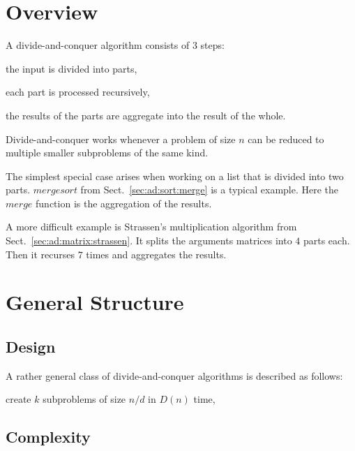 \section{Overview}

A divide-and-conquer algorithm consists of $3$ steps:
\begin{compactenum}
 \item the input is divided into parts,
 \item each part is processed recursively,
 \item the results of the parts are aggregate into the result of the whole.
\end{compactenum}
Divide-and-conquer works whenever a problem of size $n$ can be reduced to multiple smaller subproblems of the same kind.

The simplest special case arises when working on a list that is divided into two parts.
$mergesort$ from Sect.~\ref{sec:ad:sort:merge} is a typical example.
Here the $merge$ function is the aggregation of the results. 

A more difficult example is Strassen's multiplication algorithm from Sect.~\ref{sec:ad:matrix:strassen}.
It splits the arguments matrices into $4$ parts each.
Then it recurses $7$ times and aggregates the results.

\section{General Structure}

\subsection{Design}

A rather general class of divide-and-conquer algorithms is described as follows:
\begin{compactenum}
 \item create $k$ subproblems of size $n/d$ in $D(n)$ time,
 \item 
\end{compactenum}


\subsection{Complexity}

